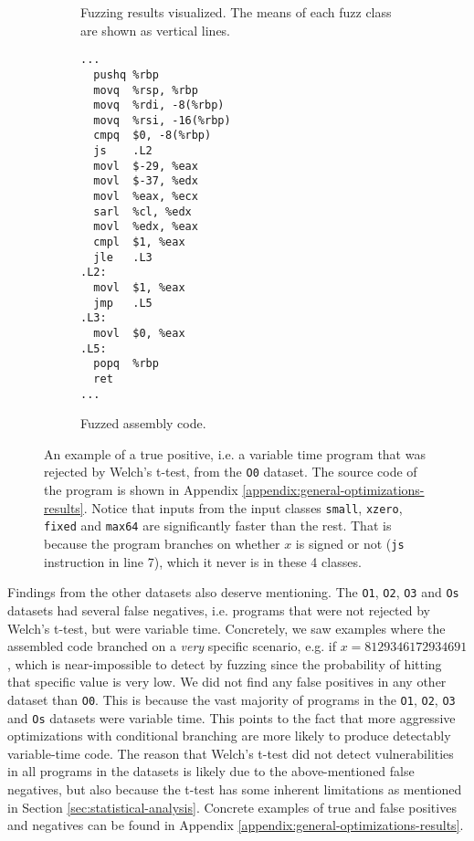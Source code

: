 \begin{figure}[H]
\begin{subfigure}[b]{0.41\textwidth}
      \caption{Fuzzing results visualized. The means of each fuzz class are shown as vertical lines.}
    \end{subfigure}
    \hspace{1cm}
    \begin{subfigure}[b]{0.3\textwidth}
      \begin{lstlisting}[style=defstyle,language={[x86masm]Assembler},basicstyle=\footnotesize\ttfamily,breaklines=true]
...
  pushq	%rbp
  movq	%rsp, %rbp
  movq	%rdi, -8(%rbp)
  movq	%rsi, -16(%rbp)
  cmpq	$0, -8(%rbp)
  js	.L2
  movl	$-29, %eax
  movl	$-37, %edx
  movl	%eax, %ecx
  sarl	%cl, %edx
  movl	%edx, %eax
  cmpl	$1, %eax
  jle	.L3
.L2:
  movl	$1, %eax
  jmp	.L5
.L3:
  movl	$0, %eax
.L5:
  popq	%rbp
  ret
...\end{lstlisting} 
       \caption{Fuzzed assembly code.}
  \end{subfigure}
  \caption{An example of a true positive, i.e. a variable time program that was rejected by Welch's t-test, from the \texttt{O0} dataset. 
  The source code of the program is shown in Appendix \ref{appendix:general-optimizations-results}. 
  Notice that inputs from the input classes \texttt{small}, \texttt{xzero}, \texttt{fixed} and \texttt{max64} are significantly faster than the rest.
  That is because the program branches on whether $x$ is signed or not (\texttt{js} instruction in line 7), which it never is in these 4 classes.}
  \label{fig:general-optimizations-O0-true-positive}
\end{figure}

Findings from the other datasets also deserve mentioning.
The \texttt{O1}, \texttt{O2}, \texttt{O3} and \texttt{Os} datasets had several false negatives, i.e. programs that were not rejected by Welch's t-test, but were variable time.
Concretely, we saw examples where the assembled code branched on a \textit{very} specific scenario, e.g. if $x = 8129346172934691$, which is near-impossible to detect by fuzzing since the probability of hitting that specific value is very low.
We did not find any false positives in any other dataset than \texttt{O0}.
This is because the vast majority of programs in the \texttt{O1}, \texttt{O2}, \texttt{O3} and \texttt{Os} datasets were variable time.
This points to the fact that more aggressive optimizations with conditional branching are more likely to produce detectably variable-time code.
The reason that Welch's t-test did not detect vulnerabilities in all programs in the datasets is likely due to the above-mentioned false negatives, but also because the t-test has some inherent limitations as mentioned in Section \ref{sec:statistical-analysis}.
Concrete examples of true and false positives and negatives can be found in Appendix \ref{appendix:general-optimizations-results}.


